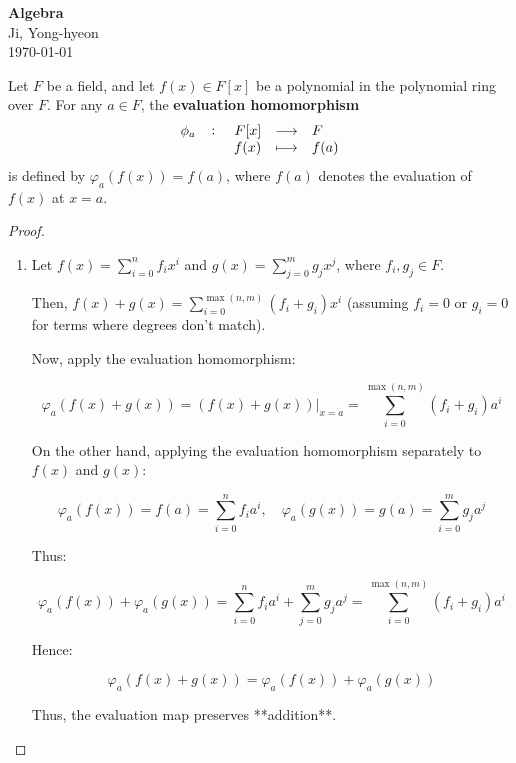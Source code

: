 \documentclass[11pt,openany]{article}
\begin{document}
\begin{center}
	\huge\textbf{Algebra}\\
	\vspace{0.5em}
	\large{Ji, Yong-hyeon}\\
	\vspace{0.5em}
	\normalsize{\today}\\
\end{center}
\begin{note}
	Let \( F \) be a field, and let \( f(x) \in F[x] \) be a polynomial in the polynomial ring over \( F \). For any \( a \in F \), the \textbf{evaluation homomorphism} \[
	\fullfunction{\phi_a}{F[x]}{F}{f(x)}{f(a)}
	\] is defined by \( \varphi_a(f(x)) = f(a) \), where \( f(a) \) denotes the evaluation of \( f(x) \) at \( x = a \).
\end{note}
\begin{proof}
	\begin{enumerate}[(1)]
		\item Let \( f(x) = \sum_{i=0}^{n} f_i x^i \) and \( g(x) = \sum_{j=0}^{m} g_j x^j \), where \( f_i, g_j \in F \).
		
		Then, \( f(x) + g(x) = \sum_{i=0}^{\max(n,m)} (f_i + g_i) x^i \) (assuming \( f_i = 0 \) or \( g_i = 0 \) for terms where degrees don’t match).
		
		Now, apply the evaluation homomorphism:
		
		\[
		\varphi_a(f(x) + g(x)) = (f(x) + g(x))\big|_{x=a} = \sum_{i=0}^{\max(n,m)} (f_i + g_i) a^i
		\]
		
		On the other hand, applying the evaluation homomorphism separately to \( f(x) \) and \( g(x) \):
		
		\[
		\varphi_a(f(x)) = f(a) = \sum_{i=0}^{n} f_i a^i, \quad \varphi_a(g(x)) = g(a) = \sum_{i=0}^{m} g_j a^j
		\]
		
		Thus:
		
		\[
		\varphi_a(f(x)) + \varphi_a(g(x)) = \sum_{i=0}^{n} f_i a^i + \sum_{j=0}^{m} g_j a^j = \sum_{i=0}^{\max(n,m)} (f_i + g_i) a^i
		\]
		
		Hence:
		
		\[
		\varphi_a(f(x) + g(x)) = \varphi_a(f(x)) + \varphi_a(g(x))
		\]
		
		Thus, the evaluation map preserves **addition**.
	\end{enumerate}
\end{proof}
\end{document}
